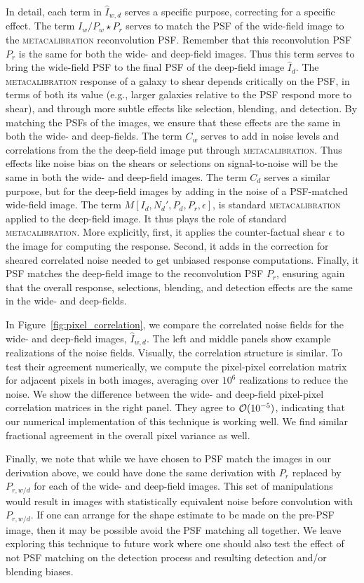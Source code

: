 \documentclass[twocolumn]{openjournal}
\makeatletter
\newcommand{\mcal}{\textsc{metacalibration}\@\xspace}
\makeatother
\begin{document}
In detail, each term in $\hat I_{w,d}$ serves a specific purpose, correcting for a
specific effect. The term $I_{w}/P_{w} \star P_{r}$ serves to match the PSF of the
wide-field image to the \mcal reconvolution PSF. Remember that this reconvolution PSF
$P_r$ is the same for both the wide- and deep-field images. Thus this term serves to
bring the wide-field PSF to the final PSF of the deep-field image $\hat I_{d}$. The
\mcal response of a galaxy to shear depends critically on the PSF, in terms of both its
value (e.g., larger galaxies relative to the PSF respond more to shear), and through
more subtle effects like selection, blending, and detection. By matching the PSFs of the
images, we ensure that these effects are the same in both the wide- and deep-fields. The
term $C_{w}$ serves to add in noise levels and correlations from the the deep-field
image put through \mcal. Thus effects like noise bias on the shears or selections on
signal-to-noise will be the same in both the wide- and deep-field images. The term
$C_{d}$ serves a similar purpose, but for the deep-field images by adding in the noise
of a PSF-matched wide-field image. The term $M[I_{d}, N_{d}', P_{d}, P_{r}, \epsilon]$, is
standard \mcal applied to the deep-field image. It thus plays the role of standard
\mcal. More explicitly, first, it applies the counter-factual shear $\epsilon$ to the
image for computing the response. Second, it adds in the correction for sheared
correlated noise needed to get unbiased response computations. Finally, it PSF matches
the deep-field image to the reconvolution PSF $P_{r}$, ensuring again that the overall
response, selections, blending, and detection effects are the same in the wide- and
deep-fields.

In Figure~\ref{fig:pixel_correlation}, we compare the correlated noise fields for the
wide- and deep-field images, $\hat I_{w,d}$. The left and middle panels show example
realizations of the noise fields. Visually, the correlation structure is similar. To
test their agreement numerically, we compute the pixel-pixel correlation matrix for
adjacent pixels in both images, averaging over $10^6$ realizations to reduce the noise.
We show the difference between the wide- and deep-field pixel-pixel correlation matrices
in the right panel. They agree to ${\cal O}(10^{-5})$, indicating that our numerical
implementation of this technique is working well. We find similar fractional agreement
in the overall pixel variance as well.

Finally, we note that while we have chosen to PSF match the images in our derivation
above, we could have done the same derivation with $P_{r}$ replaced by $P_{r,w/d}$ for
each of the wide- and deep-field images. This set of manipulations would result in
images with statistically equivalent noise before convolution with $P_{r,w/d}$. If one
can arrange for the shape estimate to be made on the pre-PSF image, then it may be
possible avoid the PSF matching all together. We leave exploring this technique to
future work where one should also test the effect of not PSF matching on the detection
process and resulting detection and/or blending biases.
\end{document}
